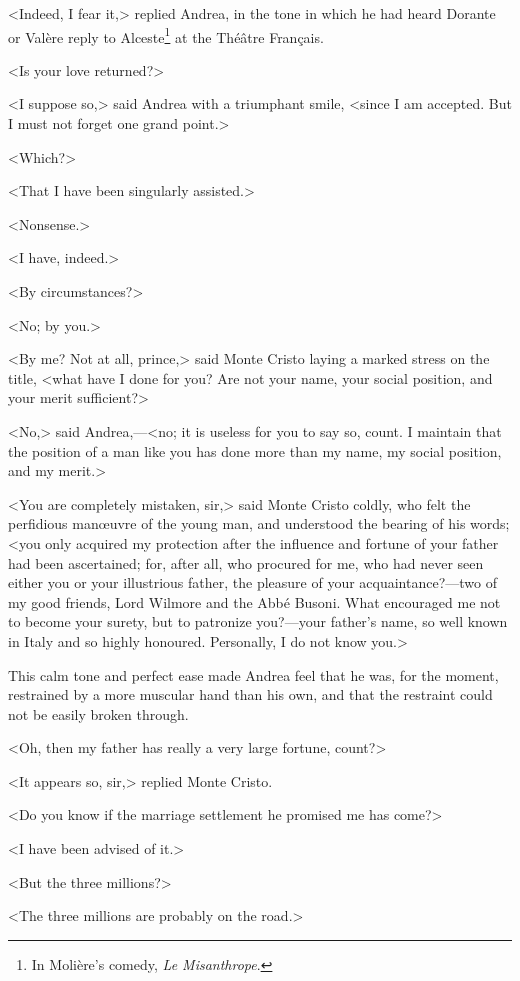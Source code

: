  <Indeed, I fear it,> replied Andrea, in the tone in which he had heard Dorante or Valère reply to Alceste\footnote{In Molière's comedy, \textit{Le Misanthrope}.} at the Théâtre Français. 

 <Is your love returned?> 

 <I suppose so,> said Andrea with a triumphant smile, <since I am accepted. But I must not forget one grand point.> 

 <Which?> 

 <That I have been singularly assisted.> 

 <Nonsense.> 

 <I have, indeed.> 

 <By circumstances?> 

 <No; by you.> 

 <By me? Not at all, prince,> said Monte Cristo laying a marked stress on the title, <what have I done for you? Are not your name, your social position, and your merit sufficient?> 

 <No,> said Andrea,—<no; it is useless for you to say so, count. I maintain that the position of a man like you has done more than my name, my social position, and my merit.> 

 <You are completely mistaken, sir,> said Monte Cristo coldly, who felt the perfidious manœuvre of the young man, and understood the bearing of his words; <you only acquired my protection after the influence and fortune of your father had been ascertained; for, after all, who procured for me, who had never seen either you or your illustrious father, the pleasure of your acquaintance?—two of my good friends, Lord Wilmore and the Abbé Busoni. What encouraged me not to become your surety, but to patronize you?—your father's name, so well known in Italy and so highly honoured. Personally, I do not know you.> 

 This calm tone and perfect ease made Andrea feel that he was, for the moment, restrained by a more muscular hand than his own, and that the restraint could not be easily broken through. 

 <Oh, then my father has really a very large fortune, count?> 

 <It appears so, sir,> replied Monte Cristo. 

 <Do you know if the marriage settlement he promised me has come?> 

 <I have been advised of it.> 

 <But the three millions?> 

 <The three millions are probably on the road.> 

